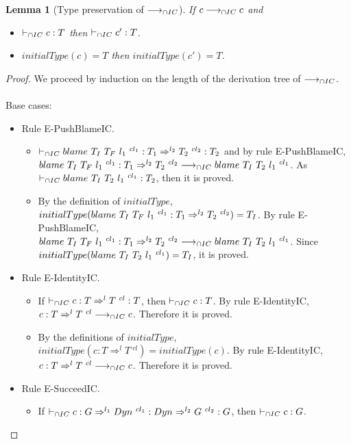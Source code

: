 \documentclass[a4paper]{article}
\newtheorem{lemma}{Lemma}
\begin{document}
\begin{lemma}[Type preservation of $\longrightarrow_{\cap IC}$]
\label{typepreservationIC}
If $c \longrightarrow_{\cap IC} c$ and
\begin{itemize}
    \item $\vdash_{\cap IC} c : T$ then $\vdash_{\cap IC} c' : T$.
    \item $initialType(c) = T$ then $initialType(c') = T$.
\end{itemize}
\end{lemma}
\begin{proof}
We proceed by induction on the length of the derivation tree of $\longrightarrow_{\cap IC}$.\\\\
Base cases:
\begin{itemize}
    \item Rule E-PushBlameIC.
    \begin{itemize}
        \item $\vdash_{\cap IC} blame\ T_I\ T_F\ l_1\ ^{cl_1} : T_1 \Rightarrow^{l_2} T_2\ ^{cl_2} : T_2$ and by rule E-PushBlameIC, $blame\ T_I\ T_F\ l_1\ ^{cl_1} : T_1 \Rightarrow^{l_2} T_2\ ^{cl_2} \longrightarrow_{\cap IC} blame\ T_I\ T_2\ l_1\ ^{cl_1}$.
        As $\vdash_{\cap IC} blame\ T_I\ T_2\ l_1\ ^{cl_1} : T_2$, then it is proved.
        \item By the definition of $initialType$, $initialType(blame\ T_I\ T_F\ l_1\ ^{cl_1} : T_1 \Rightarrow^{l_2} T_2\ ^{cl_2}) = T_I$.
        By rule E-PushBlameIC, $blame\ T_I\ T_F\ l_1\ ^{cl_1} : T_1 \Rightarrow^{l_2} T_2\ ^{cl_2} \longrightarrow_{\cap IC} blame\ T_I\ T_2\ l_1\ ^{cl_1}$.
        Since $initialType(blame\ T_I\ T_2\ l_1\ ^{cl_1}) = T_I$, it is proved.
    \end{itemize}
    \item Rule E-IdentityIC.
    \begin{itemize}
        \item If $\vdash_{\cap IC} c : T \Rightarrow^l T\ ^{cl} : T$, then $\vdash_{\cap IC} c : T$.
        By rule E-IdentityIC, $c : T \Rightarrow^l T\ ^{cl} \icos c$.
        Therefore it is proved.
        \item By the definitions of $initialType$, $initialType(c : T \Rightarrow^l T\ ^{cl}) = initialType(c)$.
        By rule E-IdentityIC, $c : T \Rightarrow^l T\ ^{cl} \icos c$.
        Therefore it is proved.
    \end{itemize}
    \item Rule E-SucceedIC.
    \begin{itemize}
        \item If $\icts c : G \Rightarrow^{l_1} \Dyn\ ^{cl_1} : \Dyn \Rightarrow^{l_2} G\ ^{cl_2} : G$, then $\vdash_{\cap IC} c : G$.

\end{itemize}
\end{itemize}
\end{proof}
\end{document}
